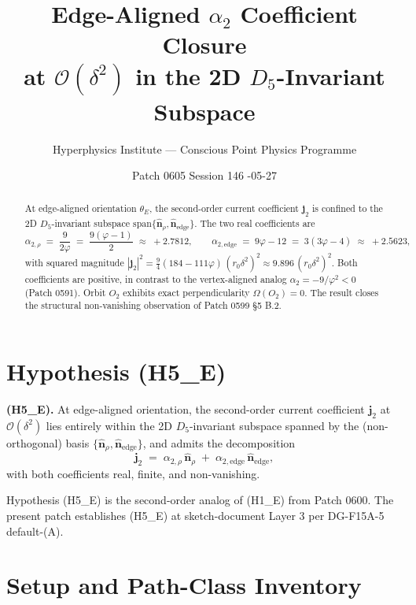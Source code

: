 \documentclass[11pt]{article}
\title{Edge-Aligned $\alpha_2$ Coefficient Closure \\[2pt]
\large at $\mathcal{O}(\delta^2)$ in the 2D $D_5$-Invariant Subspace}
\author{Hyperphysics Institute --- Conscious Point Physics Programme}
\date{Patch 0605 \quad Session 146 \quad 2026-05-27}
\begin{document}
\maketitle

\begin{abstract}
At edge-aligned orientation $\theta_E$, the second-order current
coefficient $\mathbf{j}_2$ is confined to the 2D $D_5$-invariant subspace
$\mathrm{span}\{\hat{\mathbf{n}}_\rho,\hat{\mathbf{n}}_{\text{edge}}\}$.
The two real coefficients are
\[
\alpha_{2,\rho} \;=\; \frac{9}{2\varphi} \;=\; \frac{9(\varphi-1)}{2}
\;\approx\; +2.7812,
\qquad
\alpha_{2,\text{edge}} \;=\; 9\varphi - 12 \;=\; 3(3\varphi-4)
\;\approx\; +2.5623,
\]
with squared magnitude
$|\mathbf{j}_2|^2 = \tfrac{9}{4}(184 - 111\varphi)\,(r_0\delta^2)^2
\approx 9.896\,(r_0\delta^2)^2$. Both coefficients are positive, in
contrast to the vertex-aligned analog $\alpha_2 = -9/\varphi^2 < 0$
(Patch 0591). Orbit $O_2$ exhibits exact perpendicularity
$\Omega(O_2) = 0$. The result closes the structural non-vanishing
observation of Patch 0599 §5 B.2.
\end{abstract}

\section{Hypothesis (H5\_E)}

\noindent\textbf{(H5\_E).} At edge-aligned orientation, the second-order
current coefficient $\mathbf{j}_2$ at $\mathcal{O}(\delta^2)$ lies entirely
within the 2D $D_5$-invariant subspace spanned by the (non-orthogonal)
basis $\{\hat{\mathbf{n}}_\rho,\hat{\mathbf{n}}_{\text{edge}}\}$, and
admits the decomposition
\begin{equation}
\mathbf{j}_2 \;=\; \alpha_{2,\rho}\,\hat{\mathbf{n}}_\rho
\;+\; \alpha_{2,\text{edge}}\,\hat{\mathbf{n}}_{\text{edge}},
\label{eq:H5E}
\end{equation}
with both coefficients real, finite, and non-vanishing.

\medskip
Hypothesis (H5\_E) is the second-order analog of (H1\_E) from Patch 0600.
The present patch establishes (H5\_E) at sketch-document Layer 3 per
DG-F15A-5 default-(A).

\section{Setup and Path-Class Inventory}
\end{document}
